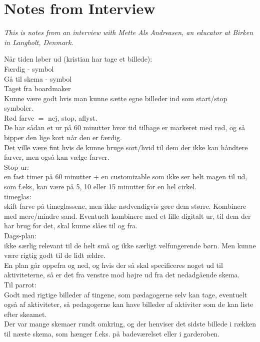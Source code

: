 \section{Notes from Interview}
\label{InterviewMette}
\textit{This is notes from an interview with Mette Als Andreasen, an educator at Birken in Langholt, Denmark.}

N\aa{}r tiden l\o{}ber ud (kristian har tage et billede):\\
F\ae{}rdig - symbol\\
G\aa{} til skema - symbol\\
Taget fra boardmaker\\

Kunne v\ae{}re godt hvis man kunne s\ae{}tte egne billeder ind som start/stop symboler.\\


R\o{}d farve $=$ nej, stop, aflyst.\\

De har s\aa{}dan et ur p\aa{} 60 minutter hvor tid tilbage er markeret med r\o{}d, og s\aa{} bipper den lige kort n\aa{}r den er f\ae{}rdig.\\
  Det ville v\ae{}re fint hvis de kunne bruge sort/hvid til dem der ikke kan h\aa{}ndtere farver, men ogs\aa{} kan v\ae{}lge farver.\\

Stop-ur:\\
en fast timer p\aa{} 60 minutter $+$ en customizable som ikke ser helt magen til ud, som f.eks, kan v\ae{}re p\aa{} 5, 10 eller 15 minutter for en hel cirkel.\\

timeglas:\\
skift farve p\aa{} timeglassene, men ikke n\o{}dvendigvis g\o{}re dem st\o{}rre. Kombinere med mere/mindre sand. Eventuelt kombinere med et lille digitalt ur, til dem der har brug for det, skal kunne sl\aa{}es til og fra.\\

Dags-plan:\\
ikke s\ae{}rlig relevant til de helt sm\aa{} og ikke s\ae{}rligt velfungerende b\o{}rn. Men kunne v\ae{}re rigtig godt til de lidt \ae{}ldre.\\
   En plan g\aa{}r oppefra og ned, og hvis der s\aa{} skal specificeres noget ud til aktiviteterne, s\aa{} er det fra venstre mod h\o{}jre ud fra det nedadg\aa{}ende skema.\\

Til parrot:\\
Godt med rigtige billeder af tingene, som p\ae{}dagogerne selv kan tage, eventuelt ogs\aa{} af aktiviteter, s\aa{} pedagogerne kan have billeder af aktiviter som de kan liste efter skeamet.\\

Der var mange skemaer rundt omkring, og der henviser det sidste billede i r\ae{}kken til n\ae{}ste skema, som h\ae{}nger f.eks. p\aa{} badev\ae{}relset eller i garderoben.